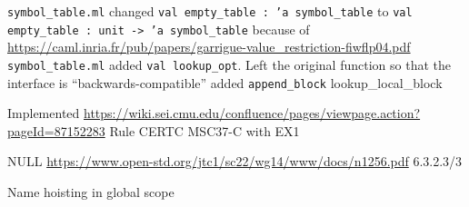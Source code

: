 
\texttt{symbol_table.ml} changed \texttt{val empty_table : 'a symbol_table} to \texttt{val empty_table : unit -> 'a symbol_table} because of \url{https://caml.inria.fr/pub/papers/garrigue-value_restriction-fiwflp04.pdf}
\texttt{symbol_table.ml} added \texttt{val lookup_opt}. Left the original function so that the interface is ``backwards-compatible''
added \texttt{append_block}
lookup_local_block

Implemented \url{https://wiki.sei.cmu.edu/confluence/pages/viewpage.action?pageId=87152283} Rule CERTC MSC37-C with EX1

NULL \url{https://www.open-std.org/jtc1/sc22/wg14/www/docs/n1256.pdf} 6.3.2.3/3

Name hoisting in global scope